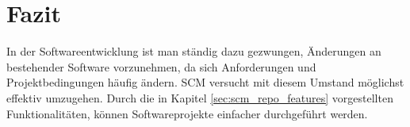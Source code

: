 \documentclass[runningheads,a4paper]{uwsese}
\begin{document}
\section{Fazit}
In der Softwareentwicklung ist man ständig dazu gezwungen, Änderungen an
bestehender Software vorzunehmen, da sich Anforderungen
und Projektbedingungen häufig ändern. SCM versucht mit diesem Umstand möglichst
effektiv umzugehen. Durch die in Kapitel \ref{sec:scm_repo_features} vorgestellten
Funktionalitäten, können Softwareprojekte einfacher durchgeführt werden.



\end{document}
